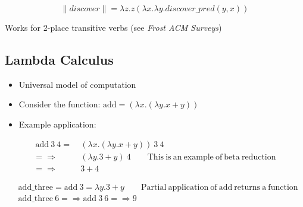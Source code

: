 \documentclass[logoontitle,tabu,supertabular,aspectratio=43]{preney-uwindsor-beamer}
\newcommand{\meaningof}[1]{\lVert #1 \rVert}
\newcommand{\wordpred}[1]{\mathit{#1\_pred}}
\newcommand{\discover}{\mathit{discover}}
\begin{document}
    \begin{frame}{\insertsubsection}
        \begin{equation*}
            \meaningof{discover} = \lambda z. z(\lambda x. \lambda y. \wordpred{\discover}(y, x))
        \end{equation*}

        \centering
        Works for 2-place transitive verbs (see \textit{Frost ACM Surveys}\cite{frost2006realization})
    \end{frame}

    \subsection*{Lambda Calculus}
    \begin{frame}{\insertsubsection}
    \begin{itemize}
        \item Universal model of computation
        \item Consider the function: $\mathrm{add} = (\lambda x.(\lambda y.x + y))$
        \item Example application:
    \end{itemize}
    \begin{equation*}
        \begin{split}
            \ \mathrm{add}\ 3\ 4 =&\ (\lambda x.(\lambda y.x + y))\ 3\ 4 \\
            =\!\Rightarrow &\ (\lambda y.3 + y)\ 4 \qquad\mathrm{This\ is\ an\ example\ of\ beta\ reduction}\\
            =\!\Rightarrow &\ 3 + 4
        \end{split}
    \end{equation*}

    \begin{equation*}
        \begin{split}
            &\mathrm{add\_three} = \mathrm{add}\ 3 = \lambda y. 3 + y \qquad\mathrm{Partial\ application\ of\ add\ returns\ a\ function}\\
            &\mathrm{add\_three}\ 6 =\!\Rightarrow \mathrm{add}\ 3\ 6 =\!\Rightarrow 9
        \end{split}
    \end{equation*}
    \end{frame}
\end{document}
